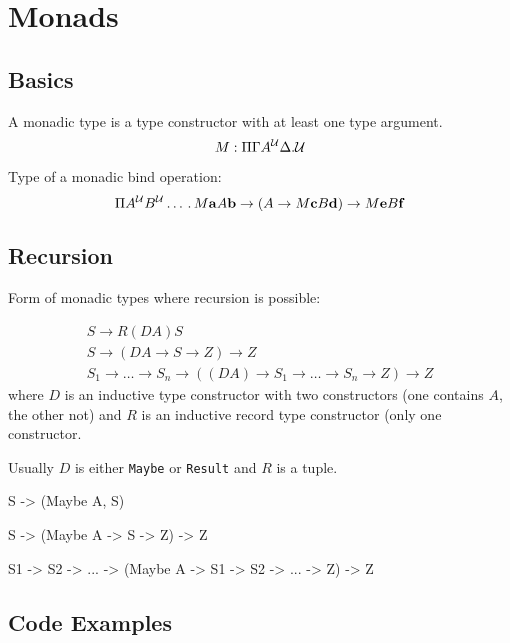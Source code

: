 \section{Monads}





\subsection{Basics}




A monadic type is a type constructor with at least one type argument.
$$
    M: \Pi \Gamma A^{\cal U} \Delta. {\cal U}
$$

Type of a monadic bind operation:
$$
    \Pi A^{\cal U} B^{\cal U} \ldots \,.\,
    M {\mathbf a} A {\mathbf b}
    \to
    (A \to M {\mathbf c} B {\mathbf d})
    \to
    M {\mathbf e} B {\mathbf f}
$$






\subsection{Recursion}

Form of monadic types where recursion is possible:

$$
\begin{array}{l}
    S \to R (D A) S
    \\
    S \to (D A \to S \to Z) \to Z
    \\
    S_1 \to \ldots \to S_n \to ((D A) \to S_1 \to \ldots \to S_n \to Z) \to Z
\end{array}
$$
where $D$ is an inductive type constructor with two constructors (one contains
$A$, the other not) and $R$ is an inductive record type constructor (only one
constructor.

Usually $D$ is either \lstinline!Maybe! or \lstinline!Result! and $R$ is a
tuple.
\begin{alba}
    S -> (Maybe A, S)

    S -> (Maybe A -> S -> Z) -> Z

    S1 -> S2 -> ... ->  (Maybe A -> S1 -> S2 -> ... -> Z) -> Z
\end{alba}




\subsection{Code Examples}




